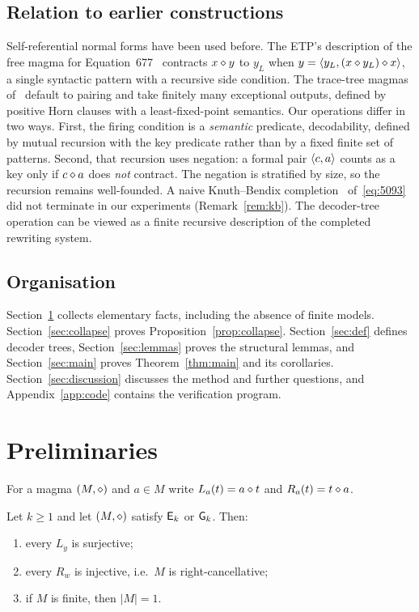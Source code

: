 \subsection{Relation to earlier constructions}
Self-referential normal forms have been used before. The ETP's description of
the free magma for Equation~677~\cite[chapter ``Equation 677'']{ETPblueprint}
contracts $x\mathbin{\diamond} y$ to $y_L$ when $y=\langle y_L,(x\mathbin{\diamond} y_L)\mathbin{\diamond} x\rangle$, a single
syntactic pattern with a recursive side condition. The trace-tree magmas
of~\cite{ZWYM2026} default to pairing and take finitely many exceptional
outputs, defined by positive Horn clauses with a least-fixed-point semantics.
Our operations differ in two ways. First, the firing condition is a
\emph{semantic} predicate, decodability, defined by mutual recursion with the
key predicate rather than by a fixed finite set of patterns. Second, that
recursion uses negation: a formal pair $\langle c,a\rangle$ counts as a key only if
$c\mathbin{\diamond} a$ does \emph{not} contract. The negation is stratified by size, so the
recursion remains well-founded. A naive Knuth--Bendix
completion~\cite{KnuthBendix} of~\eqref{eq:5093} did not terminate in our
experiments (Remark~\ref{rem:kb}). The decoder-tree operation can be viewed as a
finite recursive description of the completed rewriting system.

\subsection*{Organisation}
Section~\ref{sec:prelim} collects elementary facts, including the absence of
finite models. Section~\ref{sec:collapse} proves Proposition~\ref{prop:collapse}.
Section~\ref{sec:def} defines decoder trees, Section~\ref{sec:lemmas} proves the
structural lemmas, and Section~\ref{sec:main} proves Theorem~\ref{thm:main} and
its corollaries. Section~\ref{sec:discussion} discusses the method and further
questions, and Appendix~\ref{app:code} contains the verification program.

\section{Preliminaries}\label{sec:prelim}

For a magma $(M,\mathbin{\diamond})$ and $a\in M$ write $L_a(t)=a\mathbin{\diamond} t$ and $R_a(t)=t\mathbin{\diamond} a$.

\begin{proposition}\label{prop:basic}
Let $k\ge1$ and let $(M,\mathbin{\diamond})$ satisfy $\mathsf{E}_{k}$ or $\mathsf{G}_{k}$. Then:
\begin{enumerate}[label=\textup{(\alph*)}]
\item every $L_y$ is surjective;
\item every $R_w$ is injective, i.e.\ $M$ is right-cancellative;
\item if $M$ is finite, then $|M|=1$.
\end{enumerate}
\end{proposition}

